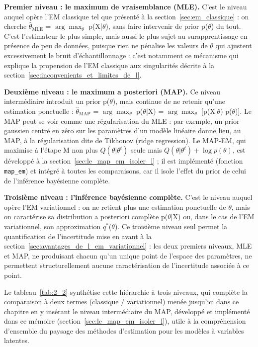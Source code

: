\textbf{Premier niveau : le maximum de vraisemblance (MLE). }C'est le niveau auquel opère l'EM classique tel que présenté à la section~\ref{sec:em_classique} : on cherche $\hat{\theta}_{\text{MLE}}$ = $\arg\max_{\theta}$ p(X|$\theta $), sans faire intervenir de prior p($\theta $) du tout. C'est l'estimateur le plus simple, mais aussi le plus sujet au surapprentissage en présence de peu de données, puisque rien ne pénalise les valeurs de $\theta $ qui ajustent excessivement le bruit d'échantillonnage : c'est notamment ce mécanisme qui explique la propension de l'EM classique aux singularités décrite à la section~\ref{sec:inconvenients_et_limites_de_l}.

\textbf{Deuxième niveau : le maximum a posteriori (MAP). }Ce niveau intermédiaire introduit un prior p($\theta $), mais continue de ne retenir qu'une estimation ponctuelle : $\hat{\theta}_{\text{MAP}}$ = $\arg\max_{\theta}$ p($\theta $|X) = $\arg\max_{\theta}$ [p(X|$\theta $) p($\theta $)]. Le MAP peut se voir comme une régularisation du MLE : par exemple, un prior gaussien centré en zéro sur les paramètres d'un modèle linéaire donne lieu, au MAP, à la régularisation dite de Tikhonov (ridge regression). Le MAP-EM, qui maximise à l'étape M non plus $Q(\theta|\theta^t)$ seule mais $Q(\theta|\theta^t) + \log p(\theta)$, est développé à la section~\ref{sec:le_map_em_isoler_l} ; il est implémenté (fonction \texttt{map\_em}) et intégré à toutes les comparaisons, car il isole l'effet du prior de celui de l'inférence bayésienne complète.

\textbf{Troisième niveau : l'inférence bayésienne complète. }C'est le niveau auquel opère l'EM variationnel : on ne retient plus une estimation ponctuelle de $\theta $, mais on caractérise sa distribution a posteriori complète p($\theta $|X) ou, dans le cas de l'EM variationnel, son approximation $q^{*}$($\theta $). Ce troisième niveau seul permet la quantification de l'incertitude mise en avant à la section~\ref{sec:avantages_de_l_em_variationnel} : les deux premiers niveaux, MLE et MAP, ne produisant chacun qu'un unique point de l'espace des paramètres, ne permettent structurellement aucune caractérisation de l'incertitude associée à ce point.

Le tableau~\ref{tab:2_2} synthétise cette hiérarchie à trois niveaux, qui complète la comparaison à deux termes (classique / variationnel) menée jusqu'ici dans ce chapitre en y insérant le niveau intermédiaire du MAP, développé et implémenté dans ce mémoire (section~\ref{sec:le_map_em_isoler_l}), utile à la compréhension d'ensemble du paysage des méthodes d'estimation pour les modèles à variables latentes.

